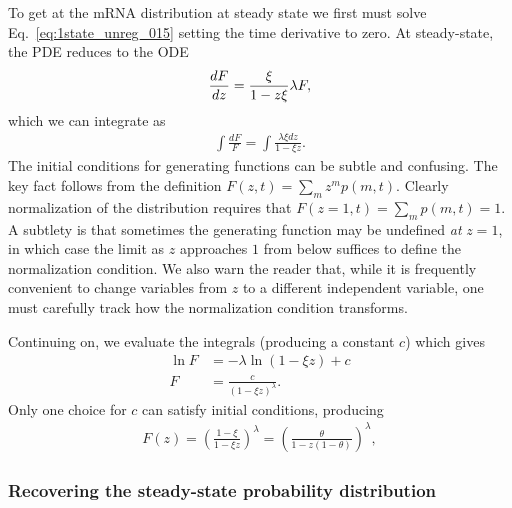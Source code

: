 To get at the mRNA distribution at steady state we first must solve
Eq.~\ref{eq:1state_unreg_015} setting the time derivative to zero. At
steady-state, the PDE reduces to the ODE
\begin{align}
\deriv[F]{z} = \frac{\xi}{1-z\xi}\lambda F,
\end{align}
which we can integrate as
\begin{align}
\int \frac{dF}{F} = \int \frac{\lambda\xi dz}{1-\xi z}.
\end{align}
The initial conditions for generating functions can be subtle and confusing. The
key fact follows from the definition
$F(z,t) = \sum_m z^m p(m,t)$.
Clearly normalization of the distribution requires that
$F(z=1, t) = \sum_m p(m,t) = 1$.
A subtlety is that sometimes the generating function may be undefined
\textit{at} $z=1$, in which case the limit as $z$ approaches $1$ from
below suffices to define the normalization condition.
We also warn the reader that, while it is frequently convenient to change
variables from $z$ to a different independent variable, one must
carefully track how the normalization condition transforms.

Continuing on, we evaluate the integrals (producing a constant $c$) which gives
\begin{align}
\ln F &= -\lambda \ln(1-\xi z) + c
\\
F &= \frac{c}{(1-\xi z)^\lambda}.
\end{align}
Only one choice for $c$ can satisfy initial conditions, producing
\begin{align}
F(z) = \left(\frac{1-\xi}{1-\xi z}\right)^\lambda
        = \left(\frac{\theta}{1 - z(1-\theta)}\right)^\lambda,
\label{eq:gen_fn}
\end{align}

\subsubsection{Recovering the steady-state probability distribution}

